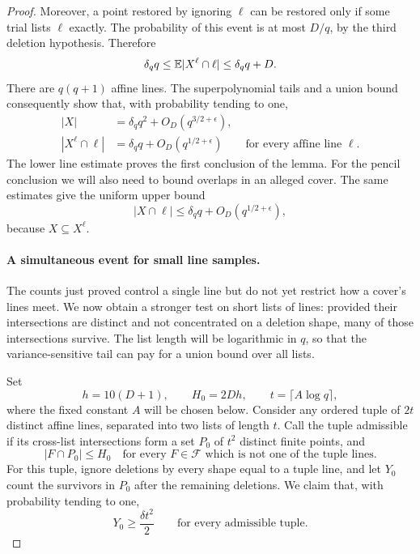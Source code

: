 \begin{proof}
Moreover, a point restored by ignoring $\ell$ can be restored only if
some trial lists $\ell$ exactly. The probability of this event is at
most $D/q$, by the third deletion hypothesis. Therefore
\[
 \delta_q q\leq \mathbb E|X^\ell\cap\ell|\leq\delta_q q+D.
\]
There are $q(q+1)$ affine lines. The superpolynomial tails and a union
bound consequently show that, with probability tending to one,
\begin{equation}\label{eq:lc-counts}
 \begin{split}
 |X|&=\delta_q q^2+O_D(q^{3/2+\epsilon}),\\
 |X^\ell\cap\ell|&=\delta_q q+O_D(q^{1/2+\epsilon})
       \qquad\text{for every affine line }\ell.
 \end{split}
\end{equation}
The lower line estimate proves the first conclusion of the lemma.
For the pencil conclusion we will also need to bound overlaps in an
alleged cover. The same estimates give the uniform upper bound
\begin{equation}\label{eq:lc-line-upper}
 |X\cap\ell|\leq\delta_q q+O_D(q^{1/2+\epsilon}),
\end{equation}
because $X\subseteq X^\ell$.

\paragraph{A simultaneous event for small line samples.}
The counts just proved control a single line but do not yet restrict
how a cover's lines meet. We now obtain a stronger test on short lists
of lines: provided their intersections are distinct and not concentrated
on a deletion shape, many of those intersections survive. The list
length will be logarithmic in $q$, so that the variance-sensitive tail
can pay for a union bound over all lists.

Set
\[
 h=10(D+1),\qquad H_0=2Dh,\qquad
 t=\lceil A\log q\rceil,
\]
where the fixed constant $A$ will be chosen below. Consider any ordered
tuple of $2t$ distinct affine lines, separated into two lists of length
$t$. Call the tuple admissible if its cross-list intersections form a
set $P_0$ of $t^2$ distinct finite points, and
\begin{equation}\label{eq:lc-occupancy}
 |F\cap P_0|\leq H_0
 \quad\text{for every }F\in\mathcal F
       \text{ which is not one of the tuple lines}.
\end{equation}
For this tuple, ignore deletions by every shape equal to a tuple line,
and let $Y_0$ count the survivors in $P_0$ after the remaining deletions.
We claim that, with probability tending to one,
\begin{equation}\label{eq:lc-tuple-event}
 Y_0\geq\frac{\delta t^2}{2}
 \qquad\text{for every admissible tuple}.
\end{equation}


\end{proof}
